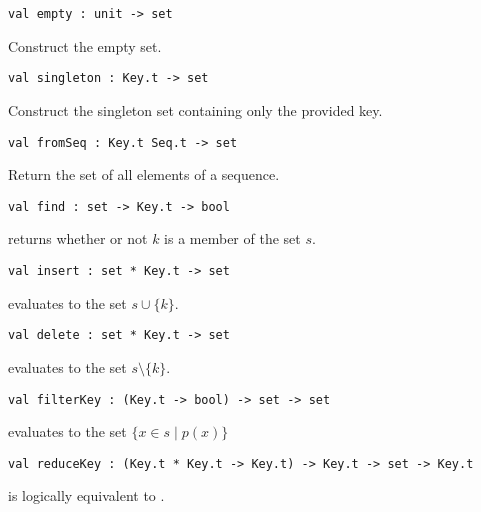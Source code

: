 \begin{gram}[empty]
\begin{verbatim}
val empty : unit -> set
\end{verbatim}
Construct the empty set.
\end{gram}

\begin{gram}[singleton]
\label{gr:ordset-interface:singleton}
\begin{verbatim}
val singleton : Key.t -> set
\end{verbatim}
Construct the singleton set containing only the provided key.
\end{gram}

\begin{gram}[fromSeq]
\label{gr:ordset-interface:fromSeq}
\begin{verbatim}
val fromSeq : Key.t Seq.t -> set
\end{verbatim}
Return the set of all elements of a sequence.
\end{gram}

\begin{gram}[find]
\begin{verbatim}
val find : set -> Key.t -> bool
\end{verbatim}
 returns whether or not $k$ is a member of the set $s$.
\end{gram}

\begin{gram}[insert]
\begin{verbatim}
val insert : set * Key.t -> set
\end{verbatim}
 evaluates to the set $s \cup \{k\}$.
\end{gram}

\begin{gram}[delete]
\begin{verbatim}
val delete : set * Key.t -> set
\end{verbatim}
 evaluates to the set $s \setminus \{k\}$.
\end{gram}

\begin{gram}[filterKey]
\begin{verbatim}
val filterKey : (Key.t -> bool) -> set -> set
\end{verbatim}
 evaluates to the set $\{x \in s \mathbin| p(x) \}$
\end{gram}

\begin{gram}[reduceKey]
\begin{verbatim}
val reduceKey : (Key.t * Key.t -> Key.t) -> Key.t -> set -> Key.t
\end{verbatim}
 is logically equivalent to .
\end{gram}

